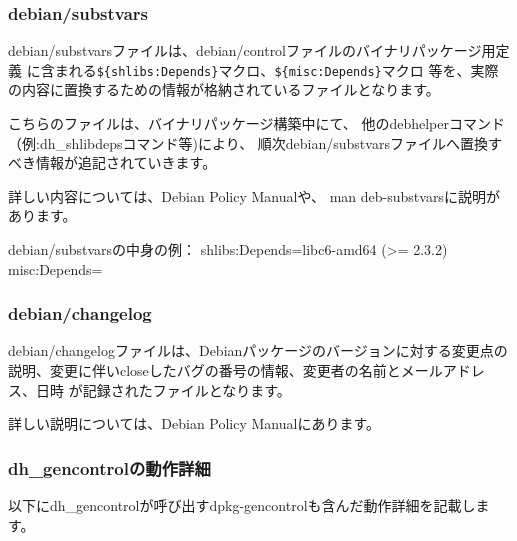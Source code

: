 \documentclass[mingoth,a4paper]{jsarticle}
\begin{document}
\subsubsection{debian/substvars}

 debian/substvarsファイルは、debian/controlファイルのバイナリパッケージ用定義
に含まれる\verb!${shlibs:Depends}!マクロ、\verb!${misc:Depends}!マクロ
等を、実際の内容に置換するための情報が格納されているファイルとなります。

 こちらのファイルは、バイナリパッケージ構築中にて、
他のdebhelperコマンド（例:dh\_shlibdepsコマンド等)により、
順次debian/substvarsファイルへ置換すべき情報が追記されていきます。

 詳しい内容については、Debian Policy Manual\cite{debpolicy}や、
man deb-substvarsに説明があります。

\begin{commandline}
debian/substvarsの中身の例：
shlibs:Depends=libc6-amd64 (>= 2.3.2)
misc:Depends=
\end{commandline}

\subsubsection{debian/changelog}

 debian/changelogファイルは、Debianパッケージのバージョンに対する変更点の
説明、変更に伴いcloseしたバグの番号の情報、変更者の名前とメールアドレス、日時
が記録されたファイルとなります。

 詳しい説明については、Debian Policy Manual\cite{debpolicy}にあります。

\subsubsection{dh\_gencontrolの動作詳細}

 以下にdh\_gencontrolが呼び出すdpkg-gencontrolも含んだ動作詳細を記載します。
\end{document}
